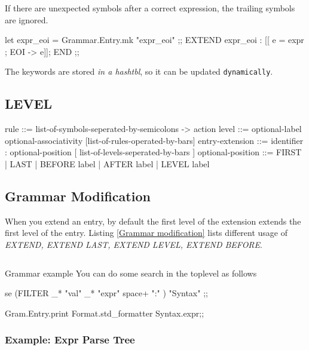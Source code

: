   If there are unexpected symbols after a correct expression, the
  trailing symbols are ignored.

  \begin{ocamlcode}
    let expr_eoi = Grammar.Entry.mk "expr_eoi" ;;
    EXTEND expr_eoi : [[ e = expr ; EOI -> e]]; END ;;
  \end{ocamlcode}

  The keywords are stored \textit{ in a hashtbl}, so it can be updated
  \verb|dynamically|.

\subsection{LEVEL}

  \begin{bluetext}
  rule ::= list-of-symbols-seperated-by-semicolons -> action 
  level ::=  optional-label optional-associativity
  [list-of-rules-operated-by-bars] 
  entry-extension ::=
  identifier : optional-position  [ list-of-levels-seperated-by-bars ] 
  optional-position ::= FIRST | LAST | BEFORE label | AFTER label |
  LEVEL label  
\end{bluetext}

\subsection{Grammar Modification}

When you extend an entry, by default the first level of the extension
extends the first level of the entry.  Listing \ref{Grammar
  modification} lists different usage of \textit{EXTEND, EXTEND LAST,
  EXTEND LEVEL, EXTEND BEFORE}.


\inputminted[fontsize=\scriptsize]{ocaml}{code/camlp4/grmmar_modification/first.ml}

Grammar example
  You can do some search in the toplevel as follows

\begin{ocamlcode}
se (FILTER _* "val" _* "expr" space+ ":" ) "Syntax" ;;
\end{ocamlcode}

\begin{ocamlcode}  
Gram.Entry.print Format.std_formatter Syntax.expr;;
\end{ocamlcode}

\subsubsection{Example: Expr Parse Tree}

